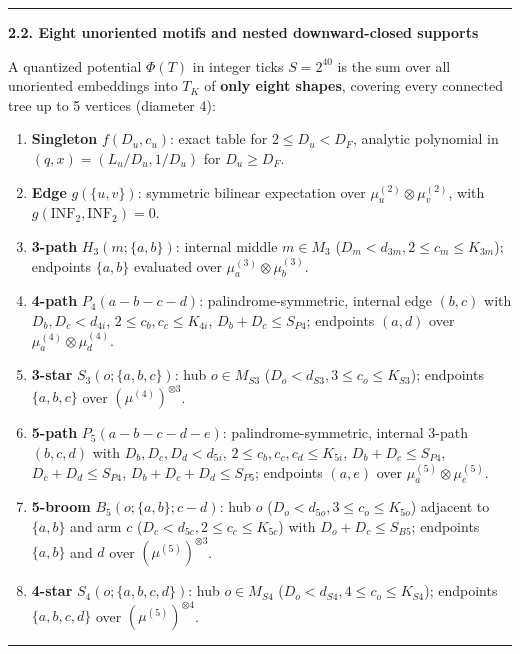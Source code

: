 \documentclass[11pt]{article}
\theoremstyle{remark}
\numberwithin{equation}{section}
\newcommand{\trhead}[1]{\par\smallskip\noindent\textbf{#1}\par\nopagebreak\smallskip}
\newenvironment{transcription}{\par\medskip\noindent\rule{\linewidth}{0.4pt}\par\nopagebreak}{\par\nopagebreak\noindent\rule{\linewidth}{0.4pt}\par\medskip}
\begin{document}
\begin{transcription}
\trhead{2.2. Eight unoriented motifs and nested downward-closed supports}
A quantized potential $\Phi(T)$ in integer ticks $S = 2^{40}$ is the sum over all unoriented embeddings into $T_K$ of \textbf{only eight shapes}, covering every connected tree up to 5 vertices (diameter 4):
\begin{enumerate}
\item \textbf{Singleton} $f(D_u, c_u)$: exact table for $2 \le D_u < D_F$, analytic polynomial in $(q, x) = (L_u/D_u, 1/D_u)$ for $D_u \ge D_F$.
\item \textbf{Edge} $g(\{u, v\})$: symmetric bilinear expectation over $\mu_u^{(2)} \otimes \mu_v^{(2)}$, with $g(\mathrm{INF}_2, \mathrm{INF}_2) = 0$.
\item \textbf{3-path} $H_3(m; \{a, b\})$: internal middle $m \in M_3$ ($D_m < d_{3m}, 2 \le c_m \le K_{3m}$); endpoints $\{a, b\}$ evaluated over $\mu_a^{(3)} \otimes \mu_b^{(3)}$.
\item \textbf{4-path} $P_4(a - b - c - d)$: palindrome-symmetric, internal edge $(b, c)$ with $D_b, D_c < d_{4i}$, $2 \le c_b, c_c \le K_{4i}$, $D_b + D_c \le S_{P4}$; endpoints $(a, d)$ over $\mu_a^{(4)} \otimes \mu_d^{(4)}$.
\item \textbf{3-star} $S_3(o; \{a, b, c\})$: hub $o \in M_{S3}$ ($D_o < d_{S3}, 3 \le c_o \le K_{S3}$); endpoints $\{a, b, c\}$ over $(\mu^{(4)})^{\otimes 3}$.
\item \textbf{5-path} $P_5(a - b - c - d - e)$: palindrome-symmetric, internal 3-path $(b, c, d)$ with $D_b, D_c, D_d < d_{5i}$, $2 \le c_b, c_c, c_d \le K_{5i}$, $D_b + D_c \le S_{P4}$, $D_c + D_d \le S_{P4}$, $D_b + D_c + D_d \le S_{P5}$; endpoints $(a, e)$ over $\mu_a^{(5)} \otimes \mu_e^{(5)}$.
\item \textbf{5-broom} $B_5(o; \{a, b\}; c - d)$: hub $o$ ($D_o < d_{5o}, 3 \le c_o \le K_{5o}$) adjacent to $\{a, b\}$ and arm $c$ ($D_c < d_{5c}, 2 \le c_c \le K_{5c}$) with $D_o + D_c \le S_{B5}$; endpoints $\{a, b\}$ and $d$ over $(\mu^{(5)})^{\otimes 3}$.
\item \textbf{4-star} $S_4(o; \{a, b, c, d\})$: hub $o \in M_{S4}$ ($D_o < d_{S4}, 4 \le c_o \le K_{S4}$); endpoints $\{a, b, c, d\}$ over $(\mu^{(5)})^{\otimes 4}$.
\end{enumerate}


\end{transcription}
\end{document}

